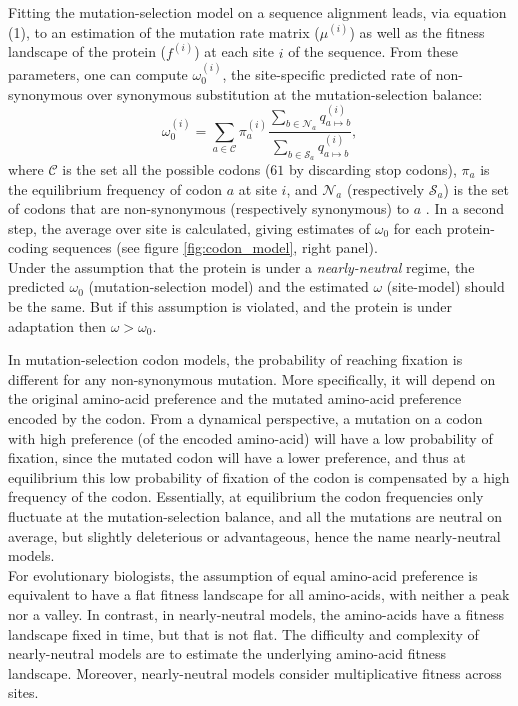 Fitting the mutation-selection model on a sequence alignment leads, via equation (1), to an estimation of the mutation rate matrix ($\mu^{(i)}$) as well as the fitness landscape of the protein ($f^{(i)}$) at each site $i$ of the sequence. From these parameters, one can compute $\omega_{0}^{(i)}$, the site-specific predicted rate of non-synonymous over synonymous substitution at the mutation-selection balance: 
\begin{equation}
\omega_{0}^{(i)} = \sum_{a \in  \mathcal{C}} \pi_a^{(i)}  \dfrac{\sum_{b \in  \mathcal{N}_a} q_{a \mapsto b}^{(i)}}{\sum_{b \in \mathcal{S}_a} q_{a \mapsto b}^{(i)}},
\end{equation}
where $\mathcal{C}$ is the set all the possible codons ($61$ by discarding stop codons), $\pi_a$ is the equilibrium frequency of codon $a$ at site $i$, and $\mathcal{N}_a$ (respectively $\mathcal{S}_a$) is the set of codons that are non-synonymous (respectively synonymous) to $a$  \cite{spielman_relationship_2015, rodrigue_site-heterogeneous_2014}. In a second step, the average over site is calculated, giving estimates of $\omega_0$ for each protein-coding sequences (see figure \ref{fig:codon_model}, right panel). \\

Under the assumption that the protein is under a \textit{nearly-neutral} regime,  the predicted $\omega_0$ (mutation-selection model) and the estimated $\omega$ (site-model) should be the same. But if this assumption is violated, and the protein is under adaptation then $\omega > \omega_0$.


In mutation-selection codon models, the probability of reaching fixation is different for any non-synonymous mutation.
More specifically, it will depend on the original amino-acid preference and the mutated amino-acid preference encoded by the codon.
From a dynamical perspective, a mutation on a codon with high preference (of the encoded amino-acid) will have a low probability of fixation, since the mutated codon will have a lower preference, and thus at equilibrium this low probability of fixation of the codon is compensated by a high frequency of the codon.
Essentially, at equilibrium the codon frequencies only fluctuate at the mutation-selection balance, and all the mutations are neutral on average, but slightly deleterious or advantageous, hence the name nearly-neutral models.\\
For evolutionary biologists, the assumption of equal amino-acid preference is equivalent to have a flat fitness landscape for all amino-acids, with neither a peak nor a valley.
In contrast, in nearly-neutral models, the amino-acids have a fitness landscape fixed in time, but that is not flat.
The difficulty and complexity of nearly-neutral models are to estimate the underlying amino-acid fitness landscape.
Moreover, nearly-neutral models consider multiplicative fitness across sites.

